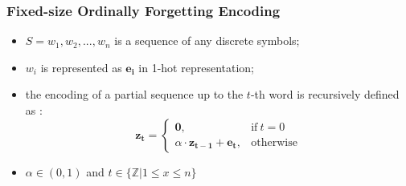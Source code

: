\documentclass{beamer}
\begin{document}
\begin{frame}
\frametitle{Fixed-size Ordinally Forgetting Encoding}
\begin{definition}[FOFE]
	\begin{itemize}
	\item $S = w_1, w_2, ..., w_n$ is a sequence of any discrete symbols;
	\item $w_i$ is represented as $\bm{e_i}$ in 1-hot representation;
	\item the encoding of a partial sequence up to the $t$-th word is recursively defined as \parencite{zhang2015fixed}:
	\begin{equation}
		\nonumber
		\bm{z_t}=
		\begin{cases}
		\bm{0}, & \text{if}\ t = 0 \\
		\alpha \cdot \bm{z_{t - 1}} + \bm{e_t}, & \text{otherwise}
		\end{cases}  \label{eq-fofe-def}
	\end{equation}
	\item $\alpha \in (0, 1)$ and $t \in \{{\mathbb Z}|1 \le x \le n\}$
	\end{itemize}
\end{definition}
\end{frame}
\end{document}
